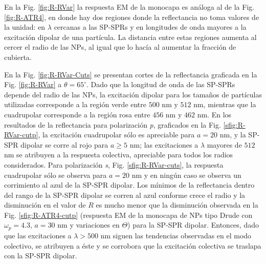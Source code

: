 En la Fig.   \ref{fig:R-RVar} la respuesta EM de la monocapa es análoga al de la Fig. \ref{fig:R-ATR4}, en donde hay dos regiones donde la reflectancia no toma valores de la unidad: en $\lambda$ cercanas a las SP-SPRs y en longitudes de onda mayores a la excitación dipolar de una partícula. La distancia entre estas regiones aumenta al cercer el radio de las NPs, al igual que lo hacía al aumentar la fracción de cubierta.

En la Fig. \ref{fig:R-RVar-Cuts} se presentan cortes de la reflectancia graficada en la Fig. \ref{fig:R-RVar} a $\theta = 65^\circ$. Dado que la longitud de onda de las SP-SPRs depende del radio de las NPs, la excitación dipolar para los tamaños de partículas utilizadas corresponde a la región verde entre $500$ nm y $512$ nm, mientras que la cuadrupolar corresponde a la región rosa entre $456$ nm y $462$ nm.
 En los resultados de la reflectancia para polarización \emph{p}, graficados en la Fig. \ref{sfig:R-RVar-cutp}, la excitación cuadrupolar sólo es apreciable para $a=20$ nm, y la SP-SPR dipolar se corre al rojo para $a\geq 5$ nm; las excitaciones a $\lambda$ mayores de $512$ nm se atribuyen a la respuesta colectiva, apreciable para todos los radios considerados. Para polarización \emph{s}, Fig. \ref{sfig:R-RVar-cuts}, la respuesta cuadrupolar sólo se observa para $a = 20$ nm y en ningún caso se observa un corrimiento al azul de la SP-SPR dipolar. Los mínimos de la reflectancia dentro del rango de la SP-SPR dipolar se corren al azul conforme crece el radio y la disminución en el valor de $R$ es mucho menor que la disminución  observada en la Fig. \ref{sfig:R-ATR4-cutp} (respuesta EM de la monocapa de NPs tipo Drude con $\omega_p = 4.3$, $a = 30$ nm y variaciones en $\Theta$) para la SP-SPR dipolar. Entonces, dado que las excitaciones a $\lambda>500$ nm siguen las tendencias observadas en el modo colectivo, se atribuyen a éste y se corrobora que la excitación colectiva se traslapa con la SP-SPR dipolar.
 
